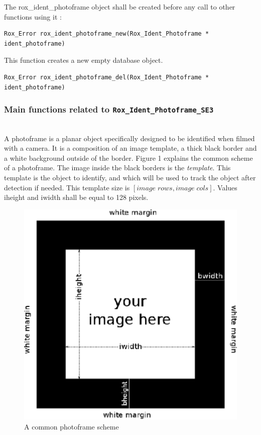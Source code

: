 \noindent The rox\_ident\_photoframe object shall be created before any call to other functions using it :

\begin{lstlisting}
Rox_Error rox_ident_photoframe_new(Rox_Ident_Photoframe * ident_photoframe) 
\end{lstlisting}

\noindent This function creates a new empty database object.

\begin{lstlisting}
Rox_Error rox_ident_photoframe_del(Rox_Ident_Photoframe * ident_photoframe)
\end{lstlisting}


\subsubsection{Main functions related to {\tt Rox\_Ident\_Photoframe\_SE3}}
\label{sss:ident_photoframe_functions}
~\\

\noindent A photoframe is a planar object specifically designed to be identified
when filmed with a camera. It is a composition of an image template, a
thick black border and a white background outside of the border.
Figure 1 explains the common scheme of a photoframe.  The image inside
the black borders is the \emph{template}. This template is the object
to identify, and which will be used to track the object after
detection if needed. This template size is
$\left[image \; rows, image \; cols\right]$.  Values iheight and iwidth shall be
equal to 128 pixels.

\begin{figure}[h]
\centering{}\includegraphics[width=0.6\columnwidth]{vision/figures/fake}
\caption{A common photoframe scheme}
\end{figure}

